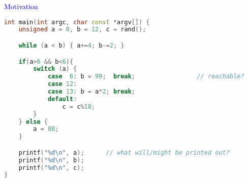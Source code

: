 %
%
%
\begin{frame}[fragile]{\textcolor{blue}{Motivation}}
\begin{footnotesize}
\begin{lstlisting}[language=C++]
int main(int argc, char const *argv[]) {
    unsigned a = 0, b = 12, c = rand();

    while (a < b) { a+=4; b-=2; }

    if(a>6 && b<6){
        switch (a) {
            case  6: b = 99;  break;                 // reachable? 
            case 12:
            case 13: b = a*2; break;
            default:
                c = c%18;
        }
    } else {
        a = 88;
    }

    printf("%d\n", a);		// what will/might be printed out?
    printf("%d\n", b);
    printf("%d\n", c);
}
\end{lstlisting}
\end{footnotesize}
\end{frame}
